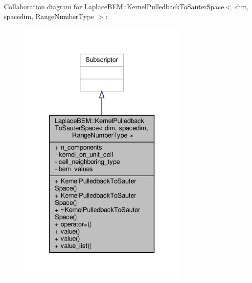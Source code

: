 Collaboration diagram for Laplace\+B\+EM\+:\+:Kernel\+Pulledback\+To\+Sauter\+Space$<$ dim, spacedim, Range\+Number\+Type $>$\+:\nopagebreak
\begin{figure}[H]
\begin{center}
\leavevmode
\includegraphics[width=240pt]{classLaplaceBEM_1_1KernelPulledbackToSauterSpace__coll__graph}
\end{center}
\end{figure}
